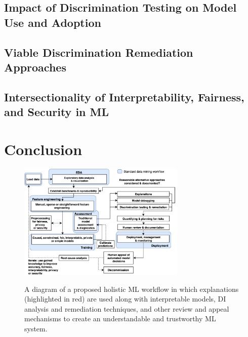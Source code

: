 \documentclass[information,article,submit,moreauthors,pdftex]{definitions/mdpi}
\begin{document}
\subsection{Impact of Discrimination Testing on Model Use and Adoption}

\subsection{Viable Discrimination Remediation Approaches}

\subsection{Intersectionality of Interpretability, Fairness, and Security in ML}






\section{Conclusion}\label{sec:con}


\begin{figure}[H]
\centering
\includegraphics[width=8cm]{img/blueprint.png}
\label{fig:blueprint}
\caption{A diagram of a proposed holistic ML workflow in which explanations (highlighted in red) are used along with interpretable models, DI analysis and remediation techniques, and other review and appeal mechanisms to create an understandable and trustworthy ML system.}
\end{figure}   
\end{document}
